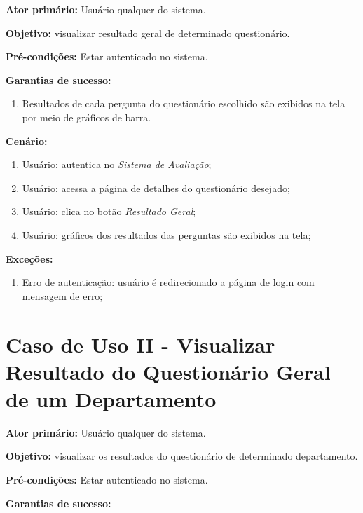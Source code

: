 \documentclass[
  12pt,       %
  openright,      %
  oneside,      %
  a4paper,      %
  english,      %
  french,        %
  spanish,     %
  brazil        %
  ]{abntex2-decsi}
\begin{document}
\begin{apendicesenv}
	\textbf{Ator primário:} Usuário qualquer do sistema.
				
    \textbf{Objetivo:} visualizar resultado geral de determinado questionário.
    
	\textbf{Pré-condições:} Estar autenticado no sistema.
		
	\textbf{Garantias de sucesso:} 
        
            \begin{enumerate}
            
            \item Resultados de cada pergunta do questionário escolhido são exibidos na tela por meio de gráficos de barra.  
            
            \end{enumerate}
        
		\textbf{Cenário:}
		
		\begin{enumerate}
			\item Usuário: autentica no \textit{Sistema de Avaliação};           
			\item Usuário: acessa a página de detalhes do questionário desejado;
            \item Usuário: clica no botão \textit{Resultado Geral};
			\item Usuário: gráficos dos resultados das perguntas são exibidos na tela;
		\end{enumerate}
		
		\textbf{Exceções:}
		
			\begin{enumerate}	
				\item Erro de autenticação: usuário é redirecionado a página de login com mensagem de erro;
			\end{enumerate}

	\newpage
    
    \section{Caso de Uso II - Visualizar Resultado do Questionário Geral de um Departamento}
    
	\textbf{Ator primário:} Usuário qualquer do sistema.
				
    \textbf{Objetivo:} visualizar os resultados do questionário de determinado departamento.
    
	\textbf{Pré-condições:} Estar autenticado no sistema.
		
	\textbf{Garantias de sucesso:} 
        

\end{apendicesenv}
\end{document}
